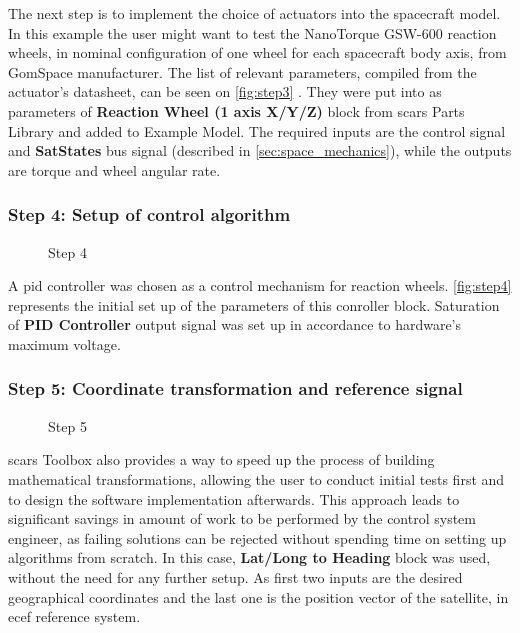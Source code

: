             The next step is to implement the choice of actuators into the spacecraft model. In this example the user might want to test the NanoTorque GSW-600 reaction wheels, in nominal configuration of one wheel for each spacecraft body axis, from GomSpace manufacturer. The list of relevant parameters, compiled from the actuator's datasheet, can be seen on \autoref{fig:step3} . They were put into as parameters of \textbf{Reaction Wheel (1 axis X/Y/Z)} block from \ac{scars} Parts Library and added to Example Model. The required inputs are the control signal and \textbf{SatStates} bus signal (described in \autoref{sec:space_mechanics}), while the outputs are torque and wheel angular rate.

        
        \subsubsection*{Step 4: Setup of control algorithm}
            \begin{figure}[H]
                \centering
                \qquad
                \caption{Step 4}%
                \label{fig:step4}%
            \end{figure}
            A \ac{pid} controller was chosen as a control mechanism for reaction wheels. \autoref{fig:step4}  represents the initial set up of the parameters of this conroller block. Saturation of \textbf{PID Controller} output signal was set up in accordance to hardware's maximum voltage.

        \subsubsection*{Step 5: Coordinate transformation and reference signal}
            \begin{figure}[H]
                \centering
                \caption{Step 5}%
                \label{fig:step5}%
            \end{figure}
            \ac{scars} Toolbox also provides a way to speed up the process of building mathematical transformations, allowing the user to conduct initial tests first and to design the software implementation afterwards. This approach leads to significant savings in amount of work to be performed by the control system engineer, as failing solutions can be rejected without spending time on setting up algorithms from scratch. In this case, \textbf{Lat/Long to Heading} block was used, without the need for any further setup. As first two inputs are the desired geographical coordinates and the last one is the position vector of the satellite, in \ac{ecef} reference system.

